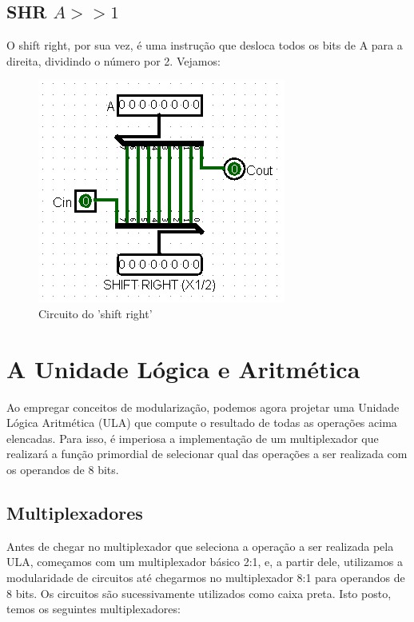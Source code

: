 \documentclass[
	12pt,				%
	openright,			%
	twoside,			%
	a4paper,			%
	english,			%
	french,				%
	spanish,			%
	brazil,				%
	]{abntex2}
\begin{document}
\section{SHR \texorpdfstring{$A >> 1$}{Lg}}

O shift right, por sua vez, é uma instrução que desloca todos os bits de A para a direita, dividindo o número por 2. Vejamos:

\begin{figure}[H]
	\begin{center}
	    \includegraphics[scale=0.6]{shiftright.png}
	\end{center}
\caption{\label{shr}Circuito do 'shift right'}
\end{figure}



\chapter{A Unidade Lógica e Aritmética}

Ao empregar conceitos de modularização, podemos agora projetar uma Unidade Lógica Aritmética (ULA) que compute o resultado de todas as operações acima elencadas. Para isso, é imperiosa a implementação de um multiplexador que realizará a função primordial de selecionar qual das operações a ser realizada com os operandos de 8 bits. 

\section{Multiplexadores}

Antes de chegar no multiplexador que seleciona a operação a ser realizada pela ULA, começamos com um multiplexador básico 2:1, e, a partir dele, utilizamos a modularidade de circuitos até chegarmos no multiplexador 8:1 para operandos de 8 bits. Os circuitos são sucessivamente utilizados como caixa preta. Isto posto, temos os seguintes multiplexadores:
\end{document}
